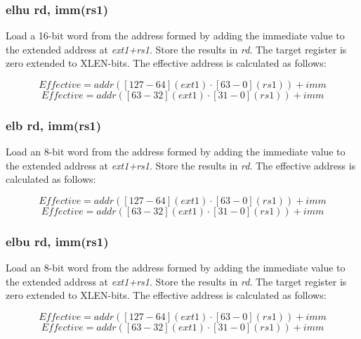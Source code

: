\documentclass{article}
\begin{document}
\subsubsection{elhu rd, imm(rs1)}
Load a 16-bit word from the address formed by adding the immediate value to the 
extended address at \textit{ext1+rs1}.  Store the results in \textit{rd}.  
 The target register is zero extended to XLEN-bits.  The effective 
address is calculated as follows: 

\begin{equation}
Effective = addr([127-64](ext1) \cdot [63-0](rs1))+imm
\end{equation}
\begin{equation}
Effective = addr([63-32](ext1) \cdot [31-0](rs1))+imm
\end{equation}

\subsubsection{elb rd, imm(rs1)}
Load an 8-bit word from the address formed by adding the immediate value to the 
extended address at \textit{ext1+rs1}.  Store the results in \textit{rd}.  The effective 
address is calculated as follows: 

\begin{equation}
Effective = addr([127-64](ext1) \cdot [63-0](rs1))+imm
\end{equation}
\begin{equation}
Effective = addr([63-32](ext1) \cdot [31-0](rs1))+imm
\end{equation}

\subsubsection{elbu rd, imm(rs1)}
Load an 8-bit word from the address formed by adding the immediate value to the 
extended address at \textit{ext1+rs1}.  Store the results in \textit{rd}.  
 The target register is zero extended to XLEN-bits.  The effective 
address is calculated as follows: 

\begin{equation}
Effective = addr([127-64](ext1) \cdot [63-0](rs1))+imm
\end{equation}
\begin{equation}
Effective = addr([63-32](ext1) \cdot [31-0](rs1))+imm
\end{equation}
\end{document}
